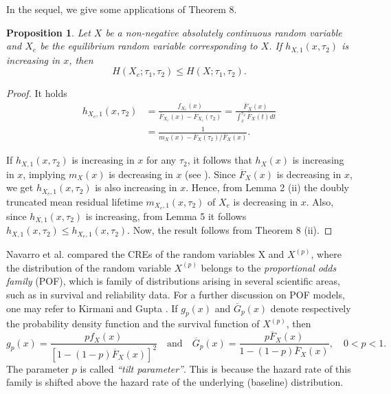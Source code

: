 \documentclass[11pt]{article}
\newtheorem{proposition}{Proposition}
\begin{document}
In the sequel, we give some applications of Theorem 8.

 
\begin{proposition}
	Let $X$ be a non-negative absolutely continuous random variable and $X_e$ be the equilibrium random variable corresponding to $X$. If $h_{X,1}(x,\tau_2)$ is increasing in $x$, then
	$$ H(X_e;\tau_1,\tau_2) \leq H(X;\tau_1,\tau_2). $$
\end{proposition}

\begin{proof}
	It holds
	\begin{align*}
		h_{X_e,1}(x,\tau_2) & = \frac{f_{X_e}(x)}{\overline{F}_{X_e}(x) - \overline{F}_{X_e}(\tau_2)} = \frac{\overline{F}_X(x)}{\int_x^{\tau_2} \overline{F}_X(t) dt} \\ 
		& = \frac{1}{m_X(x) - \overline{F}_X(\tau_2)/\overline{F}_X(x)}.
	\end{align*}
	
	If $h_{X,1}(x,\tau_2)$ is increasing in $x$ for any $\tau_2$, it follows that $h_X(x)$ is increasing in $x$, implying $m_X(x)$ is decreasing in $x$ (see \cite{Willmot2001}). Since $\overline{F}_X(x)$ is decreasing in $x$, we get $h_{X_e,1}(x,\tau_2)$ is also increasing in $x$. Hence, from Lemma 2 (ii) the doubly truncated mean residual lifetime $m_{X_e,1}(x,\tau_2)$ of $X_e$ is decreasing in $x$. Also, since $h_{X,1}(x,\tau_2)$ is increasing, from Lemma 5 it follows $h_{X,1}(x,\tau_2) \leq h_{X_e,1}(x,\tau_2)$. Now, the result follows from Theorem 8 (ii).
\end{proof}

Navarro et al. \cite{Navarro2010} compared the CREs of the random variables X and $X^{(p)}$, where the distribution of the random variable $X^{(p)}$ belongs to the \textit{proportional odds family} (POF), which is family of distributions arising in several scientific areas, such as in survival and reliability data. For a further discussion on POF models, one may refer to Kirmani and Gupta \cite{Kirmani2001}. If $g_p(x)$ and $\overline{G}_p(x)$ denote respectively the probability density function and the survival function of $X^{(p)}$, then
\begin{equation} \textstyle
	g_p(x) = \frac{p f_X(x)}{[1 - (1 - p) \overline{F}_X(x)]^2} \quad \text{and} \quad \overline{G}_p(x) = \frac{p \overline{F}_X(x)}{1 - (1 - p) \overline{F}_X(x)}, \quad 0 < p < 1.
\end{equation}
The parameter $p$ is called \textit{``tilt parameter''}. This is because the hazard rate of this family is shifted above the hazard rate of the underlying (baseline) distribution.
\end{document}
